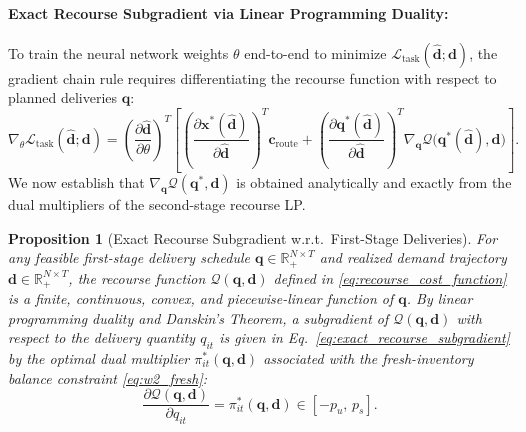 \documentclass[11pt,a4paper]{article}
\newtheorem{proposition}{Proposition}
\theoremstyle{definition}
\theoremstyle{remark}
\begin{document}
\paragraph{Exact Recourse Subgradient via Linear Programming Duality:}
To train the neural network weights $\theta$ end-to-end to minimize $\mathcal{L}_{\text{task}}(\hat{\mathbf{d}}; \mathbf{d})$, the gradient chain rule requires differentiating the recourse function with respect to planned deliveries $\mathbf{q}$:
\begin{equation*}
    \nabla_\theta \mathcal{L}_{\text{task}}(\hat{\mathbf{d}}; \mathbf{d}) = \left( \frac{\partial \hat{\mathbf{d}}}{\partial \theta} \right)^T \left[ \left( \frac{\partial \mathbf{x}^*(\hat{\mathbf{d}})}{\partial \hat{\mathbf{d}}} \right)^T \mathbf{c}_{\text{route}} + \left( \frac{\partial \mathbf{q}^*(\hat{\mathbf{d}})}{\partial \hat{\mathbf{d}}} \right)^T \nabla_{\mathbf{q}} \mathcal{Q}\big(\mathbf{q}^*(\hat{\mathbf{d}}), \mathbf{d}\big) \right].
\end{equation*}
We now establish that $\nabla_{\mathbf{q}} \mathcal{Q}(\mathbf{q}^*, \mathbf{d})$ is obtained analytically and exactly from the dual multipliers of the second-stage recourse LP.

\begin{proposition}[Exact Recourse Subgradient w.r.t.\ First-Stage Deliveries]
\label{prop:recourse_subgradient}
For any feasible first-stage delivery schedule $\mathbf{q} \in \mathbb{R}_+^{N \times T}$ and realized demand trajectory $\mathbf{d} \in \mathbb{R}_+^{N \times T}$, the recourse function $\mathcal{Q}(\mathbf{q}, \mathbf{d})$ defined in \eqref{eq:recourse_cost_function} is a finite, continuous, convex, and piecewise-linear function of $\mathbf{q}$. By linear programming duality and Danskin's Theorem, a subgradient of $\mathcal{Q}(\mathbf{q}, \mathbf{d})$ with respect to the delivery quantity $q_{it}$ is given in Eq.~\eqref{eq:exact_recourse_subgradient} by the optimal dual multiplier $\pi_{it}^*(\mathbf{q}, \mathbf{d})$ associated with the fresh-inventory balance constraint \eqref{eq:w2_fresh}:
\begin{equation}
    \frac{\partial \mathcal{Q}(\mathbf{q}, \mathbf{d})}{\partial q_{it}} = \pi_{it}^*(\mathbf{q}, \mathbf{d}) \in \left[ -p_u, \, p_s \right]. \label{eq:exact_recourse_subgradient}
\end{equation}
\end{proposition}
\end{document}
